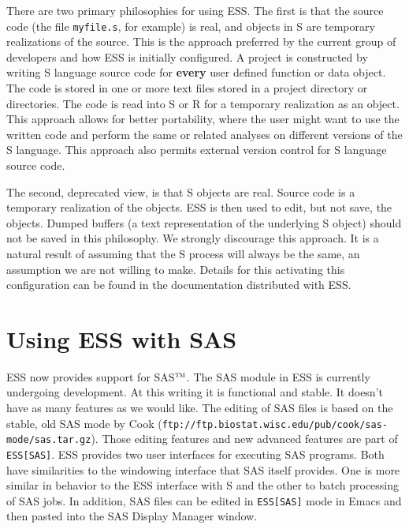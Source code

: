 \documentclass{article}
\newcommand{\stexttt}[1]{{\small\texttt{#1}}}
\newcommand{\ssf}[1]{{\small\sf{#1}}}
\newcommand{\tm}{$^{\mbox{\scriptsize\sc tm}}$}
\newenvironment{Salltt}{\small\begin{alltt}}{\end{alltt}}
\begin{document}
There are two primary philosophies for using ESS.  The first is that
the source code (the file \stexttt{myfile.s}, for example) is real,
and objects in S are temporary realizations of the source.  This is
the approach preferred by the current group of developers and how ESS
is initially configured.  A project is constructed by writing S
language source code for \textbf{every} user defined function or data
object.  The code is stored in one or more text files stored in a
project directory or directories.  The code is read into S or R for a
temporary realization as an object.  This approach allows for better
portability, where the user might want to use the written code and
perform the same or related analyses on different versions of the S
language.  This approach also permits external version control for
S language source code.

The second, deprecated view, is that S objects are real.  Source code
is a temporary realization of the objects.  ESS is then used to edit, but
not save, the objects.  Dumped buffers
(a text representation of the underlying S object)
should not be saved in this philosophy.  We strongly discourage this approach.
It is a
natural result of assuming that the S process will always be the
same, an assumption we are not willing to make.
Details for this activating this configuration can be found in the
documentation distributed with ESS.


\section{Using ESS with SAS}
\label{sec:SAS}

ESS now provides support for SAS\tm.  The SAS module in ESS is
currently undergoing development.  At this writing it is functional
and stable.  It doesn't have as many features as we would like.  The
editing of SAS files is based on the stable, old SAS mode by Cook
(\stexttt{ftp://ftp.biostat.wisc.edu/pub/cook/sas-mode/sas.tar.gz}).
Those editing features and new advanced features are part of
\stexttt{ESS[SAS]}.  ESS provides two user interfaces for executing SAS
programs.  Both have similarities to the
windowing interface that SAS itself provides.
One is more similar in behavior to the ESS interface with S
and the other to batch processing of SAS jobs.  In addition, SAS files can be
edited in \stexttt{ESS[SAS]} mode in Emacs and then pasted into the SAS
Display Manager \ssf{Program Editor} window.
\end{document}
